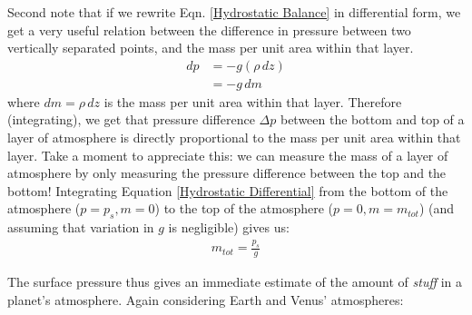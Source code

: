 Second note that if we rewrite Eqn. \ref{Hydrostatic Balance} in differential form, we get a very useful relation between the difference in pressure between two vertically separated points, and the mass per unit area within that layer.
\begin{align}\label{Hydrostatic Differential}
    dp& =-g(\rho\, dz) \\
    & = -g \,dm\nonumber
\end{align}
where $dm=\rho\,dz$ is the mass per unit area within that layer. Therefore (integrating), we get that pressure difference $\Delta p$ between the bottom and top of a layer of atmosphere is directly proportional to the mass per unit area within that layer. Take a moment to appreciate this: we can measure the mass of a layer of atmosphere by only measuring the pressure difference between the top and the bottom! Integrating Equation \ref{Hydrostatic Differential} from the bottom of the atmosphere ($p=p_s,m=0$) to the top of the atmosphere ($p=0,m=m_{tot}$) (and assuming that variation in $g$ is negligible) gives us:
\begin{align}\label{Total Mass Hydrostatic}
    m_{tot}=\frac{p_s}{g}
\end{align}

The surface pressure thus gives an immediate estimate of the amount of \textit{stuff} in a planet's atmosphere. Again considering Earth and Venus' atmospheres:


